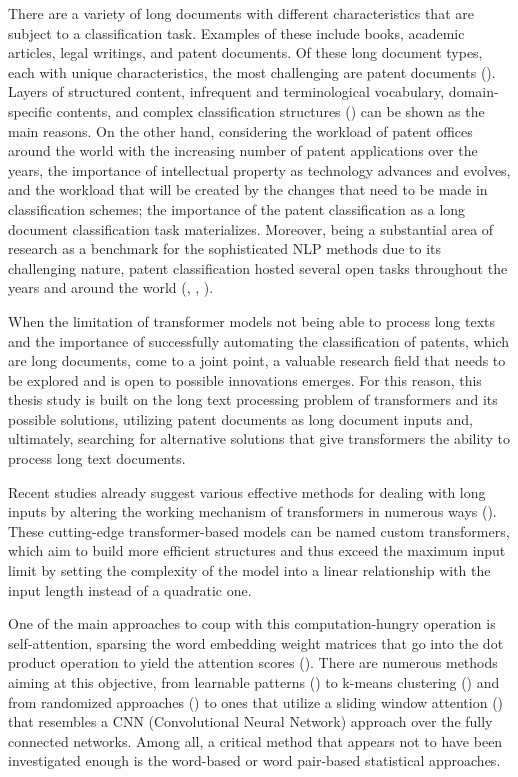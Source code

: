 \documentclass{iyte}
\begin{document}
There are a variety of long documents with different characteristics that are subject to a classification task. Examples of these include books, academic articles, legal writings, and patent documents. Of these long document types, each with unique characteristics, the most challenging are patent documents (\citealt{larkey_some_issues}). Layers of structured content, infrequent and terminological vocabulary, domain-specific contents, and complex classification structures (\citealt{patent_classification_book_survey}) can be shown as the main reasons. On the other hand, considering the workload of patent offices around the world with the increasing number of patent applications over the years, the importance of intellectual property as technology advances and evolves, and the workload that will be created by the changes that need to be made in classification schemes; the importance of the patent classification as a long document classification task materializes. Moreover, being a substantial area of research as a benchmark for the sophisticated NLP methods due to its challenging nature, patent classification hosted several open tasks throughout the years and around the world (\citealt{task_NTCIR}, \citealt{task_CLEF-IP}, \citealt{task_ATLA_2018}).

When the limitation of transformer models not being able to process long texts and the importance of successfully automating the classification of patents, which are long documents, come to a joint point, a valuable research field that needs to be explored and is open to possible innovations emerges. For this reason, this thesis study is built on the long text processing problem of transformers and its possible solutions, utilizing patent documents as long document inputs and, ultimately, searching for alternative solutions that give transformers the ability to process long text documents.  

Recent studies already suggest various effective methods for dealing with long inputs by altering the working mechanism of transformers in numerous ways (\citealt{efficient_transformers_survey}). These cutting-edge transformer-based models can be named custom transformers, which aim to build more efficient structures and thus exceed the maximum input limit by setting the complexity of the model into a linear relationship with the input length instead of a quadratic one.

One of the main approaches to coup with this computation-hungry operation is self-attention, sparsing the word embedding weight matrices that go into the dot product operation to yield the attention scores (\citealt{efficient_transformers_survey}). There are numerous methods aiming at this objective, from learnable patterns (\citealt{reformer}) to k-means clustering (\citealt{routing_transformers}) and from randomized approaches (\citealt{BigBird}) to ones that utilize a sliding window attention (\citealt{longformer}) that resembles a CNN (Convolutional Neural Network) approach over the fully connected networks. Among all, a critical method that appears not to have been investigated enough is the word-based or word pair-based statistical approaches.
\end{document}
